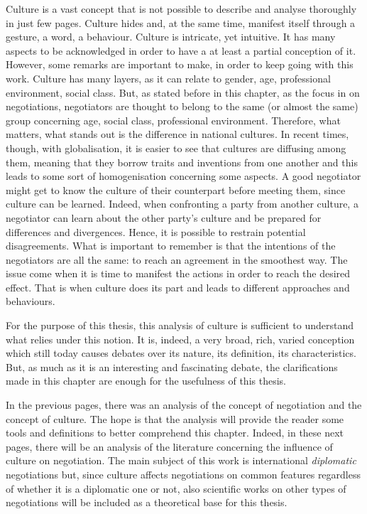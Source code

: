 \documentclass[../main.tex]{subfiles}
\begin{document}
Culture is a vast concept that is not possible to describe and analyse thoroughly in just few pages. Culture hides and, at the same time, manifest itself through a gesture, a word, a behaviour. Culture is intricate, yet intuitive. It has many aspects to be acknowledged in order to have a at least a partial conception of it. However, some remarks are important to make, in order to keep going with this work. Culture has many layers, as it can relate to gender, age, professional environment, social class. But, as stated before in this chapter, as the focus in on negotiations, negotiators are thought to belong to the same (or almost the same) group concerning age, social class, professional environment. Therefore, what matters, what stands out is the difference in national cultures. In recent times, though, with globalisation, it is easier to see that cultures are diffusing among them, meaning that they borrow traits and inventions from one another and this leads to some sort of homogenisation concerning some aspects.
A good negotiator might get to know the culture of their counterpart before meeting them, since culture can be learned. Indeed, when confronting a party from another culture, a negotiator can learn about the other party's culture and be prepared for differences and divergences. Hence, it is possible to restrain potential disagreements. What is important to remember is that the intentions of the negotiators are all the same: to reach an agreement in the smoothest way. The issue come when it is time to manifest the actions in order to reach the desired effect. That is when culture does its part and leads to different approaches and behaviours.

For the purpose of this thesis, this analysis of culture is sufficient to understand what relies under this notion. It is, indeed, a very broad, rich, varied conception which still today causes debates over its nature, its definition, its characteristics. But, as much as it is an interesting and fascinating debate, the clarifications made in this chapter are enough for the usefulness of this thesis.
\pagebreak


In the previous pages, there was an analysis of the concept of negotiation and the concept of culture. The hope is that the analysis will provide the reader some tools and definitions to better comprehend this chapter. Indeed, in these next pages, there will be an analysis of the literature concerning the influence of culture on negotiation. The main subject of this work is international \textit{diplomatic} negotiations but, since culture affects negotiations on common features regardless of whether it is a diplomatic one or not, also scientific works on other types of negotiations will be included as a theoretical base for this thesis.%
\end{document}

